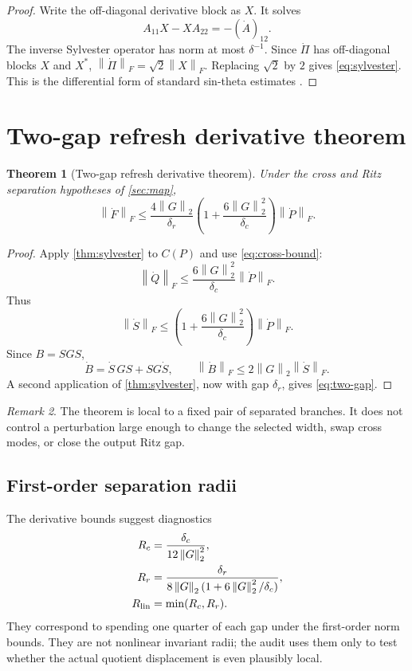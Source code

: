 \documentclass[11pt]{article}
\newtheorem{theorem}{Theorem}[section]
\theoremstyle{definition}
\theoremstyle{remark}
\newtheorem{remark}[theorem]{Remark}
\newcommand{\norm}[1]{\left\lVert#1\right\rVert}
\begin{document}
\begin{proof}
Write the off-diagonal derivative block as $X$.  It solves
\[
 A_{11}X-XA_{22}=-(\dot A)_{12}.
\]
The inverse Sylvester operator has norm at most $\delta^{-1}$.  Since
$\dot\Pi$ has off-diagonal blocks $X$ and $X^*$,
$\norm{\dot\Pi}_F=\sqrt2\norm X_F$.  Replacing $\sqrt2$ by $2$ gives
\eqref{eq:sylvester}.  This is the differential form of standard
sin-theta estimates \citep{DavisKahan1970}.
\end{proof}

\section{Two-gap refresh derivative theorem}
\label{sec:theorem}

\begin{theorem}[Two-gap refresh derivative theorem]
\label{thm:two-gap}
Under the cross and Ritz separation hypotheses of \cref{sec:map},
\begin{equation}
 \norm{\dot F}_F
 \le
 \frac{4\norm G_2}{\delta_r}
 \left(1+\frac{6\norm G_2^2}{\delta_c}\right)
 \norm{\dot P}_F.
 \label{eq:two-gap}
\end{equation}
\end{theorem}

\begin{proof}
Apply \cref{thm:sylvester} to $C(P)$ and use
\eqref{eq:cross-bound}:
\[
 \norm{\dot Q}_F
 \le\frac{6\norm G_2^2}{\delta_c}\norm{\dot P}_F.
\]
Thus
\[
 \norm{\dot S}_F
 \le\left(1+\frac{6\norm G_2^2}{\delta_c}\right)
 \norm{\dot P}_F.
\]
Since $B=SGS$,
\[
 \dot B=\dot S\,GS+SG\dot S,\qquad
 \norm{\dot B}_F\le2\norm G_2\norm{\dot S}_F.
\]
A second application of \cref{thm:sylvester}, now with gap $\delta_r$, gives
\eqref{eq:two-gap}.
\end{proof}

\begin{remark}
The theorem is local to a fixed pair of separated branches.  It does not
control a perturbation large enough to change the selected width, swap cross
modes, or close the output Ritz gap.
\end{remark}

\subsection{First-order separation radii}

The derivative bounds suggest diagnostics
\begin{align}
 R_c&=\frac{\delta_c}{12\norm G_2^2},\\
 R_r&=\frac{\delta_r}
 {8\norm G_2(1+6\norm G_2^2/\delta_c)},\\
 R_{\rm lin}&=\min(R_c,R_r).
 \label{eq:radii}
\end{align}
They correspond to spending one quarter of each gap under the first-order
norm bounds.  They are not nonlinear invariant radii; the audit uses them only
to test whether the actual quotient displacement is even plausibly local.
\end{document}
